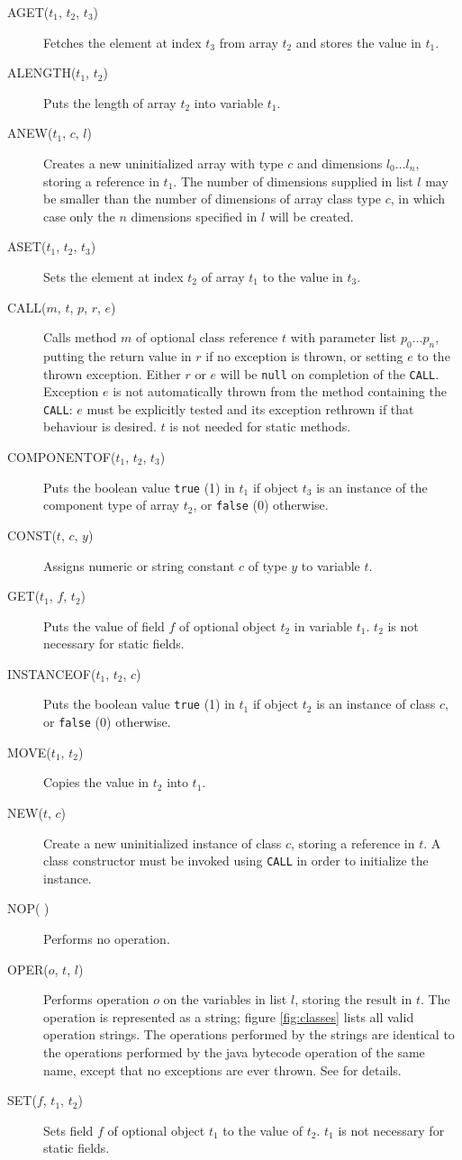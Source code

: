 \documentclass[11pt,notitlepage,twocolumn,twoside]{article}
\begin{document}
\begin{description}
\item[AGET($t_1$, $t_2$, $t_3$)] Fetches the element at index $t_3$
from array $t_2$ and stores the value in $t_1$.
%
\item[ALENGTH($t_1$, $t_2$)] Puts the length of array $t_2$ into
variable $t_1$.
%
\item[ANEW($t_1$, $c$, $l$)] Creates a new uninitialized array with
type $c$ and dimensions $l_0 \ldots l_n$, storing a reference in
$t_1$.  The number of dimensions
supplied in list $l$ may be smaller than the number of dimensions of
array class type $c$, in which case only the $n$ dimensions specified
in $l$ will be created.
%
\item[ASET($t_1$, $t_2$, $t_3$)] Sets the element at index $t_2$ of
array $t_1$ to the value in $t_3$.
%
\item[CALL($m$, $t$, $p$, $r$, $e$)] Calls method $m$ of optional class
reference $t$ with parameter list $p_0 \ldots p_n$, 
putting the return value in $r$
if no exception is thrown, or setting $e$ to the thrown exception.
Either $r$ or $e$ will be \texttt{null} on completion of the
\texttt{CALL}.  Exception $e$ is not automatically thrown from the
method containing the \texttt{CALL}: $e$ must be explicitly tested and
its exception rethrown if that behaviour is desired. $t$ is not needed
for static methods.
%
\item[COMPONENTOF($t_1$, $t_2$, $t_3$)] Puts the boolean value
\texttt{true} (1) in $t_1$ if object $t_3$ is an instance of the component
type of array $t_2$, or \texttt{false} (0) otherwise.
%
\item[CONST($t$, $c$, $y$)] Assigns numeric or string constant $c$ of 
type $y$ to variable $t$.
%
\item[GET($t_1$, $f$, $t_2$)] Puts the value of field $f$ of optional
object $t_2$ in variable $t_1$. $t_2$ is not necessary for static fields.
%
\item[INSTANCEOF($t_1$, $t_2$, $c$)] Puts the boolean value
\texttt{true} (1) in $t_1$ if object $t_2$ is an instance of class
$c$, or \texttt{false} (0) otherwise.
%
\item[MOVE($t_1$, $t_2$)] Copies the value in $t_2$ into $t_1$.
%
\item[NEW($t$, $c$)] Create a new uninitialized instance of class $c$,
storing a reference in $t$.  A class constructor must be invoked using
\texttt{CALL} in order to initialize the instance.
%
\item[NOP( )] Performs no operation.
%
\item[OPER($o$, $t$, $l$)] Performs operation $o$ on the variables in
list $l$, storing the result in $t$.  The operation is represented as
a string; figure \ref{fig:classes} lists all valid operation strings.
The operations performed by the strings are identical to the
operations performed by the java bytecode operation of the same name,
except that no exceptions are ever thrown.  See \cite{jvm} for
details.
%
\item[SET($f$, $t_1$, $t_2$)] Sets field $f$ of optional object $t_1$ to the
value of $t_2$.  $t_1$ is not necessary for static fields.
\end{description}
\end{document}
